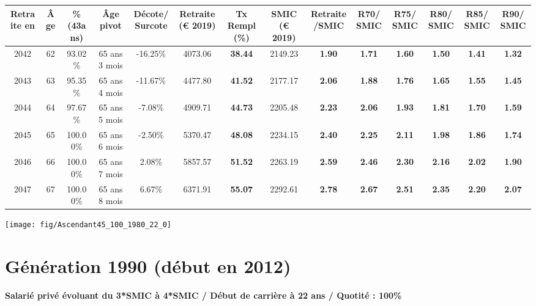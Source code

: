 \begin{adjustbox}{max width=\textwidth} 
\begin{tabular}[htb]{|c|c||c|c|c||c|c||c|c||c|c|c|c|c|} 
\hline 
 Retraite en &  Âge &  \%(43ans) &  Âge pivot &  Décote/Surcote &  Retraite (\euro{} 2019) &  Tx Rempl(\%) &  SMIC (\euro{} 2019) &  Retraite/SMIC &  R70/SMIC &  R75/SMIC &  R80/SMIC &  R85/SMIC &  R90/SMIC \\ 
\hline \hline 
 2042 &  62 &  93.02\% &  65 ans 3 mois &  -16.25\% &  4073.06 &  {\bf 38.44} &  2149.23 &  {\bf 1.90} &  {\bf 1.71} &  {\bf 1.60} &  {\bf 1.50} &  {\bf 1.41} &  {\bf 1.32} \\ 
\hline 
 2043 &  63 &  95.35\% &  65 ans 4 mois &  -11.67\% &  4477.80 &  {\bf 41.52} &  2177.17 &  {\bf 2.06} &  {\bf 1.88} &  {\bf 1.76} &  {\bf 1.65} &  {\bf 1.55} &  {\bf 1.45} \\ 
\hline 
 2044 &  64 &  97.67\% &  65 ans 5 mois &  -7.08\% &  4909.71 &  {\bf 44.73} &  2205.48 &  {\bf 2.23} &  {\bf 2.06} &  {\bf 1.93} &  {\bf 1.81} &  {\bf 1.70} &  {\bf 1.59} \\ 
\hline 
 2045 &  65 &  100.00\% &  65 ans 6 mois &  -2.50\% &  5370.47 &  {\bf 48.08} &  2234.15 &  {\bf 2.40} &  {\bf 2.25} &  {\bf 2.11} &  {\bf 1.98} &  {\bf 1.86} &  {\bf 1.74} \\ 
\hline 
 2046 &  66 &  100.00\% &  65 ans 7 mois &  2.08\% &  5857.57 &  {\bf 51.52} &  2263.19 &  {\bf 2.59} &  {\bf 2.46} &  {\bf 2.30} &  {\bf 2.16} &  {\bf 2.02} &  {\bf 1.90} \\ 
\hline 
 2047 &  67 &  100.00\% &  65 ans 8 mois &  6.67\% &  6371.91 &  {\bf 55.07} &  2292.61 &  {\bf 2.78} &  {\bf 2.67} &  {\bf 2.51} &  {\bf 2.35} &  {\bf 2.20} &  {\bf 2.07} \\ 
\hline 
\hline 
\end{tabular} 
\end{adjustbox} 
 
 \vspace{0.1cm} 

 {\hspace{-2.2cm}\texttt{[image: fig/Ascendant45\_100\_1980\_22\_0]}} 

\newpage 
 
\section{Génération 1990 (début en 2012)\label{Ascendant45_100_1990_22_0}} 
 
{\bf \noindent Salarié privé évoluant du 3*SMIC à 4*SMIC / Début de carrière à 22 ans / Quotité : 100\%}  ~ 

